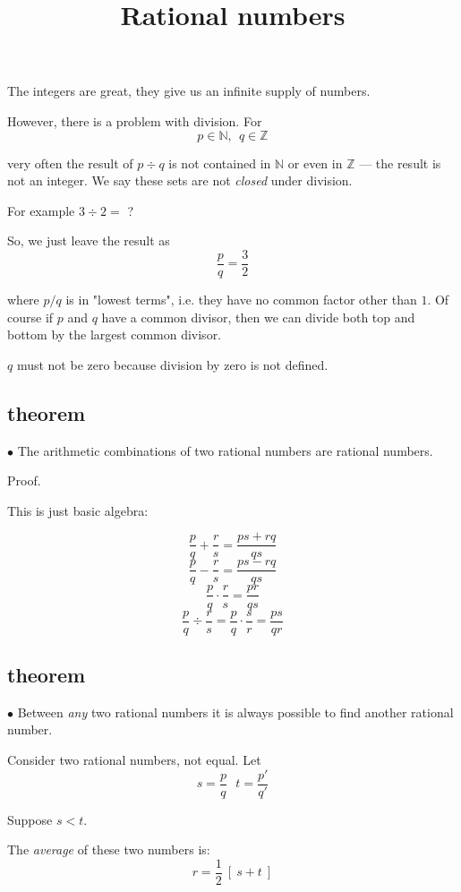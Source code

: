 \documentclass[11pt, oneside]{article}
\title{Rational numbers}
\date{}
\begin{document}
\maketitle
\Large
The integers are great, they give us an infinite supply of numbers.

However, there is a problem with division.  For
\[ p \in \mathbb{N}, \ \ q \in \mathbb{Z} \]

very often the result of $p  \div q$ is not contained in $\mathbb{N}$ or even in $\mathbb{Z}$ --- the result is not an integer. We say these sets are not \emph{closed} under division.

For example $3 \div 2 =$ ?

So, we just leave the result as 
\[ \frac{p}{q} = \frac{3}{2} \]

where $p/q$ is in "lowest terms", i.e. they have no common factor other than $1$.  Of course if $p$ and $q$ have a common divisor, then we can divide both top and bottom by the largest common divisor.

$q$ must not be zero because division by zero is not defined.

\subsection*{theorem}

$\bullet$  The arithmetic combinations of two rational numbers are rational numbers.

Proof.

This is just basic algebra:

\[  \frac{p}{q} + \frac{r}{s} = \frac{ps + rq}{qs} \]
\[  \frac{p}{q} - \frac{r}{s} = \frac{ps - rq}{qs} \]
\[  \frac{p}{q} \cdot \frac{r}{s} = \frac{pr}{qs} \]
\[  \frac{p}{q} \div \frac{r}{s} = \frac{p}{q} \cdot \frac{s}{r} = \frac{ps}{qr} \]

\subsection*{theorem}

$\bullet$  Between \emph{any} two rational numbers it is always possible to find another rational number.  

Consider two rational numbers, not equal.  Let
\[ s = \frac{p}{q} \ \ \ t = \frac{p'}{q'} \]

Suppose $s < t$.

The \emph{average} of these two numbers is:
\[ r = \frac{1}{2} \ [ \ s + t \ ] \]
\end{document}
